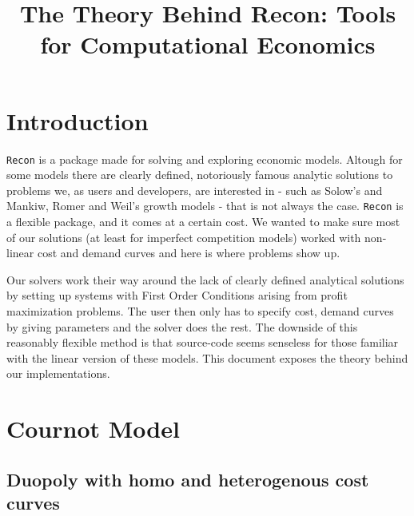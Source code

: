 \documentclass[11pt, a4paper]{article}
\title{The Theory Behind Recon: Tools for Computational Economics}
\author{Mateus Evangelsita\thanks{Department of Economics, Pontifical Catholic University of Rio de Janeiro (PUC-Rio)} \and Pedro Cavalcante Oliveira\thanks{School of Economics, Federal Fluminense University (UFF) \and Marcelo Gelati \thanks{National Institute of Pure and Applied Mathematics (IMPA) \and Diego S. Cardoso \thanks{Dyson School of Management and Applied Economics, Cornell University}}}}
\begin{document}
\maketitle

\section{Introduction}

\texttt{Recon} is a package made for solving and exploring economic models. Altough for some models there are clearly defined, notoriously famous analytic solutions to problems we, as users and developers, are interested in - such as Solow's and Mankiw, Romer and Weil's growth models - that is not always the case. \texttt{Recon} is a flexible package, and it comes at a certain cost. We wanted to make sure most of our solutions (at least for imperfect competition models) worked with non-linear cost and demand curves and here is where problems show up.

Our solvers work their way around the lack of clearly defined analytical solutions by setting up systems with First Order Conditions arising from profit maximization problems. The user then only has to specify cost, demand curves by giving parameters and the solver does the rest. The downside of this reasonably flexible method is that source-code seems senseless for those familiar with the linear version of these models. This document exposes the theory behind our implementations.

\section{Cournot Model}
\subsection{Duopoly with homo and heterogenous cost curves}
\end{document}
